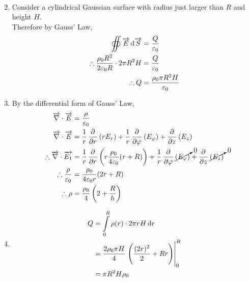 \documentclass[fleqn, a4paper, 12pt, twoside]{article}
\theoremstyle{definition}
\theoremstyle{theorem}
\begin{document}
\begin{solution}
\begin{enumerate}[leftmargin=*]
\begin{align*}
			\end{align*}
		\item
			Consider a cylindrical Gaussian surface with radius just larger than $R$ and height $H$.\\
			Therefore by Gauss' Law,
			\begin{align*}
				\oiint \overrightarrow{E} \dif \overrightarrow{S}                 & = \frac{Q}{\varepsilon_0} \\
				\therefore \frac{\rho_0 R^2}{2 \varepsilon_0 R} \cdot 2 \pi R^2 H & = \frac{Q}{\varepsilon_0} \\
				\therefore Q                                                      & = \frac{\rho_0 \pi R^2 H}{\varepsilon_0}
			\end{align*}
		\item
			By the differential form of Gauss' Law,
			\begin{align*}
				\overrightarrow{\nabla} \cdot \overrightarrow{E}              & = \frac{\rho}{\varepsilon_0}                                                                                                                                              \\
				\overrightarrow{\nabla} \cdot \overrightarrow{E}              & = \frac{1}{r} \dpd{}{r} (r E_r) + \frac{1}{r} \dpd{}{\varphi} (E_{\varphi}) + \dpd{}{z} (E_z)                                                                             \\
				\therefore \overrightarrow{\nabla} \cdot \overrightarrow{E_1} & = \frac{1}{r} \dpd{}{r} \left( r \frac{\rho_0}{4 \varepsilon_0} (r + R) \right) + \frac{1}{r} \dpd{}{\varphi} \cancelto{0}{(E_{\varphi})} + \dpd{}{z} \cancelto{0}{(E_z)} \\
				\therefore \frac{\rho}{\varepsilon_0}                         & = \frac{\rho_0}{4 \varepsilon_0 r} (2 r + R)                                                                                                                              \\
				\therefore \rho                                               & = \frac{\rho_0}{4} \left( 2 + \frac{R}{h} \right)
			\end{align*}
		\item
			\begin{align*}
				Q & = \int\limits_{0}^{R} \rho(r) \cdot 2 \pi r H \dif r                                     \\
                                  & = \frac{2 \rho_0 \pi H}{4} \left. \left( \frac{(2 r)^2}{2} + R r \right) \right|_{0}^{R} \\
                                  & = \pi R^2 H \rho_0
			\end{align*}
	\end{enumerate}
\end{solution}
\end{document}
